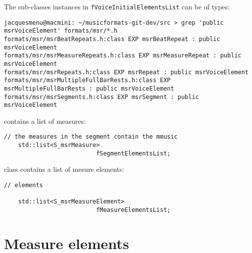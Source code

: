 The  sub-classes instances in {\tt fVoiceInitialElementsList} can be of types:
\begin{lstlisting}[language=Terminal]
jacquesmenu@macmini: ~/musicformats-git-dev/src > grep 'public msrVoiceElement' formats/msr/*.h
formats/msr/msrBeatRepeats.h:class EXP msrBeatRepeat : public msrVoiceElement
formats/msr/msrMeasureRepeats.h:class EXP msrMeasureRepeat : public msrVoiceElement
formats/msr/msrRepeats.h:class EXP msrRepeat : public msrVoiceElement
formats/msr/msrMultipleFullBarRests.h:class EXP msrMultipleFullBarRests : public msrVoiceElement
formats/msr/msrSegments.h:class EXP msrSegment : public msrVoiceElement
\end{lstlisting}

 contains a list of measures:
\begin{lstlisting}[language=CPlusPlus]
    // the measures in the segment contain the mmusic
    std::list<S_msrMeasure>
                          fSegmentElementsList;
\end{lstlisting}

class   {\tt } contains a list of mesure elements:
\begin{lstlisting}[language=CPlusPlus]
    // elements

    std::list<S_msrMeasureElement>
                          fMeasureElementsList;
\end{lstlisting}


\section{Measure elements}

